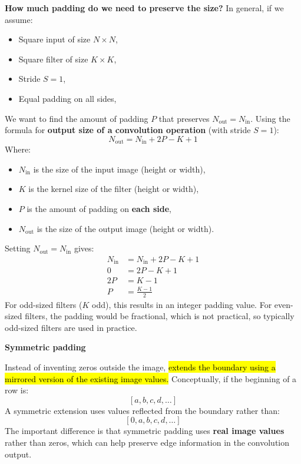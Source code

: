 \noindent
\textcolor{Green3}{ \textbf{How much padding do we need to preserve the size?}} In general, if we assume:
\begin{itemize}
    \item Square input of size $N \times N$,
    \item Square filter of size $K \times K$,
    \item Stride $S=1$,
    \item Equal padding on all sides,
\end{itemize}
We want to find the amount of padding $P$ that preserves $N_{\text{out}} = N_{\text{in}}$. Using the formula for \textbf{output size of a convolution operation} (with stride $S=1$):
\begin{equation}\label{eq:output-size-convolution-stride-1}
    N_{\text{out}} = N_{\text{in}} + 2P - K + 1
\end{equation}
Where:
\begin{itemize}
    \item $N_{\text{in}}$ is the size of the input image (height or width),
    \item $K$ is the kernel size of the filter (height or width),
    \item $P$ is the amount of padding on \textbf{each side},
    \item $N_{\text{out}}$ is the size of the output image (height or width).
\end{itemize}
Setting $N_{\text{out}} = N_{\text{in}}$ gives:
\begin{align*}
    N_{\text{in}} &= N_{\text{in}} + 2P - K + 1 \\
    0 &= 2P - K + 1 \\
    2P &= K - 1 \\
    P &= \frac{K - 1}{2}
\end{align*}
For odd-sized filters ($K$ odd), this results in an integer padding value. For even-sized filters, the padding would be fractional, which is not practical, so typically odd-sized filters are used in practice.

\highspace
\begin{flushleft}
    \textcolor{Green3}{ \textbf{Symmetric padding}}
\end{flushleft}
Instead of inventing zeros outside the image,  \hl{extends the boundary using a mirrored version of the existing image values.} Conceptually, if the beginning of a row is:
\begin{equation*}
    \left[a, b, c, d, \dots\right]
\end{equation*}
A symmetric extension uses values reflected from the boundary rather than:
\begin{equation*}
    \left[0, a, b, c, d, \dots\right]
\end{equation*}
The important difference is that symmetric padding uses \textbf{real image values} rather than zeros, which can help preserve edge information in the convolution output.

